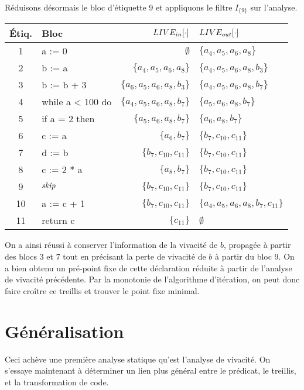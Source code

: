 \documentclass[a4paper, 10pt]{article}
\begin{document}
\begin{example}
Réduisons désormais le bloc d'étiquette 9 et appliquons le filtre $I_{\{9\}}$ sur l'analyse.
\begin{center}
	\begin{tabular}{||c|l|r|l||}
	\hline
	Étiq. & Bloc & $LIVE_{in}[\cdot]$ & $LIVE_{out}[\cdot]$ \\
	\hline
	1 & a := 0 & $\emptyset$ & $\{a_4, a_5, a_6, a_8\}$\\
	2 & b := a & $\{a_4, a_5, a_6, a_8\}$ & $\{a_4, a_5, a_6, a_8, b_3\}$\\
	3 & b := b + 3 & $\{a_6, a_5, a_6, a_8, b_3\}$ & $\{a_4, a_5, a_6, a_8, b_7\}$\\
	4 & while a < 100 do & $\{a_4, a_5, a_6, a_8, b_7\}$ & $\{a_5, a_6, a_8, b_7\}$\\
	5 & if a = 2 then & $\{a_5, a_6, a_8, b_7\}$ & $\{a_6, a_8, b_7\}$\\
	6 & c := a & $\{a_6, b_7\}$ & $\{b_7, c_{10}, c_{11}\}$\\
	7 & d := b & $\{b_7, c_{10}, c_{11}\}$ & $\{b_7, c_{10}, c_{11}\}$\\
	8 & c := 2 * a & $\{a_8, b_7\}$ & $\{b_7, c_{10}, c_{11}\}$\\
	9 & $\textit{skip}$ & $\{b_7, c_{10}, c_{11}\}$ & $\{b_7, c_{10}, c_{11}\}$\\
	10 & a := c + 1 & $\{b_7, c_{10}, c_{11}\}$ & $\{a_4, a_5, a_6, a_8, b_7, c_{11}\}$\\
	11 & return c & $\{c_{11}\}$ & $\emptyset$\\
	\hline
	\end{tabular}
\end{center}
On a ainsi réussi à conserver l'information de la vivacité de $b$, propagée à partir des blocs 3 et 7 tout en précisant
la perte de vivacité de $b$ à partir du bloc 9.
On a bien obtenu un pré-point fixe de cette déclaration réduite à partir de l'analyse de vivacité précédente.
Par la monotonie de l'algorithme d'itération, on peut donc faire croître ce treillis et trouver le point fixe minimal.
\end{example}
\section{Généralisation}
Ceci achève une première analyse statique qu'est l'analyse de vivacité. On s'essaye maintenant à déterminer
un lien plus général entre le prédicat, le treillis, et la transformation de code.
\end{document}
